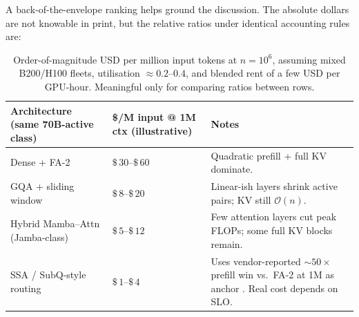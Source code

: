 A back-of-the-envelope ranking helps ground the discussion. The absolute
dollars are not knowable in print, but the relative ratios under
identical accounting rules are:

\begin{table}[htbp]
\noindent
\footnotesize
\setlength{\tabcolsep}{4pt}
\begin{tabularx}{\linewidth}{@{} >{\raggedright\arraybackslash}p{4.6cm} >{\raggedright\arraybackslash}p{3.2cm} >{\raggedright\arraybackslash}X @{}}
\toprule
Architecture (same 70B-active class) & \$/M input @ 1M ctx (illustrative) & Notes \\
\midrule
Dense + FA-2 & \(\$\,30\)--\(\$\,60\) & Quadratic prefill + full KV dominate. \\
GQA + sliding window & \(\$\,8\)--\(\$\,20\) & Linear-ish layers shrink active pairs; KV still \(\mathcal{O}(n)\). \\
Hybrid Mamba--Attn (Jamba-class) & \(\$\,5\)--\(\$\,12\) & Few attention layers cut peak FLOPs; some full KV blocks remain. \\
SSA / SubQ-style routing & \(\$\,1\)--\(\$\,4\) & Uses vendor-reported \(\sim 50\times\) prefill win vs.\ FA-2 at 1M as anchor \citep{subq2026ssa}. Real cost depends on SLO. \\
\bottomrule
\end{tabularx}
\caption{Order-of-magnitude USD per million input tokens at \(n=10^{6}\),
assuming mixed B200/H100 fleets, utilisation \(\approx 0.2\)--\(0.4\),
and blended rent of a few USD per GPU-hour. Meaningful only for comparing
ratios between rows.}
\label{tab:dollar-per-m}
\end{table}

